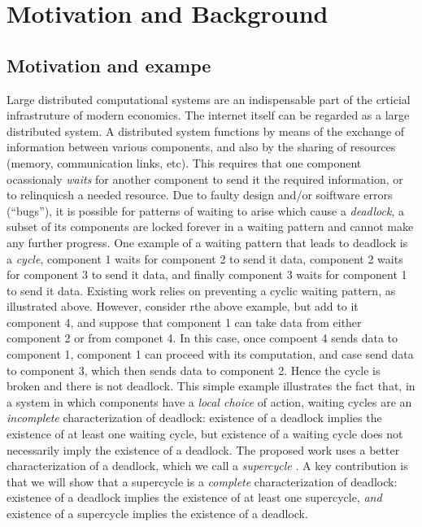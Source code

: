 \section{Motivation and Background}

\subsection{Motivation and exampe}

Large distributed computational systems are an indispensable part of the crticial infrastruture of modern economics. The internet itself can be
regarded as a large distributed system.
%
A distributed system functions by means of the exchange of information between various components, and also by the sharing of resources (\eg memory,
communication links, etc). This requires that one component ocassionaly \emph{waits} for another component to send it the required information, or to
relinquicsh a needed resource.  Due to faulty design and/or soiftware errors (``bugs''), it is possible for patterns of waiting to arise which cause a
{\em deadlock}, \ie a subset of its components are locked forever in a waiting pattern and cannot make any further progress.
%
One example of a waiting pattern that leads to deadlock is a \emph{cycle}, \eg component 1 waits for component 2 to send it data, 
component 2 waits for component 3 to send it data, and finally 
component 3 waits for component 1 to send it data.
%
Existing work relies on preventing a cyclic waiting pattern, as illustrated above. However, consider rthe above example, but add to it component 4,
and suppose that component 1 can take data from either component 2 or from componet 4. In this case, once compoent 4 sends data to component 1,
component 1 can proceed with its computation, and case send data to component 3, which then sends data to component 2. Hence the cycle is broken and
there is not deadlock.
%
This simple example illustrates the fact that, in a system in which components have a \emph{local choice} of action, waiting cycles are an
\emph{incomplete} characterization of deadlock: existence of a deadlock implies the existence of at least one waiting cycle, but existence of a
waiting cycle does not necessarily imply the existence of a deadlock.
%
The proposed work uses a better characterization of a deadlock, which we call a \emph{supercycle} \cite{FORTE13}. 
A key contribution is that we will show that a supercycle is a 
\emph{complete} characterization of deadlock: existence of a deadlock implies the existence of at least one supercycle, \emph{and} existence of a
supercycle implies the existence of a deadlock.

